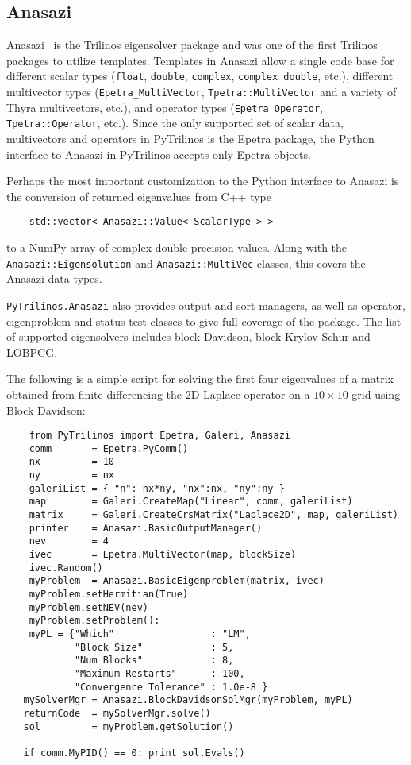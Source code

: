 \documentclass[11pt]{article}
\begin{document}
\subsection{Anasazi}
\label{sec:anasazi}

Anasazi~\cite{Anasazi} is the Trilinos eigensolver package and was one of the first Trilinos packages to utilize templates.  Templates in Anasazi allow a single code base for different scalar types ({\tt float}, {\tt double}, {\tt complex}, {\tt complex double}, etc.), different multivector types ({\tt Epetra\_MultiVector}, {\tt Tpetra::MultiVector} and a variety of Thyra multivectors, etc.), and operator types ({\tt Epetra\_Operator}, {\tt Tpetra::Operator}, etc.).  Since the only supported set of scalar data, multivectors and operators in PyTrilinos is the Epetra package, the Python interface to Anasazi in PyTrilinos accepts only Epetra objects.

Perhaps the most important customization to the Python interface to Anasazi is the conversion of returned eigenvalues from C++ type
\begin{verbatim}
    std::vector< Anasazi::Value< ScalarType > >
\end{verbatim}
to a NumPy array of complex double precision values.  Along with the {\tt Anasazi::Eigensolution} and {\tt Anasazi::MultiVec} classes, this covers the Anasazi data types.

{\tt PyTrilinos.Anasazi} also provides output and sort managers, as well as operator, eigenproblem and status test classes to give full coverage of the package.  The list of supported eigensolvers includes block Davidson, block Krylov-Schur and LOBPCG.

The following is a simple script for solving the first four eigenvalues of a matrix obtained from finite differencing the 2D Laplace operator on a $10\times10$ grid using Block Davidson:
\begin{verbatim}
    from PyTrilinos import Epetra, Galeri, Anasazi
    comm       = Epetra.PyComm()
    nx         = 10
    ny         = nx
    galeriList = { "n": nx*ny, "nx":nx, "ny":ny }
    map        = Galeri.CreateMap("Linear", comm, galeriList)
    matrix     = Galeri.CreateCrsMatrix("Laplace2D", map, galeriList)
    printer    = Anasazi.BasicOutputManager()
    nev        = 4
    ivec       = Epetra.MultiVector(map, blockSize)
    ivec.Random()
    myProblem  = Anasazi.BasicEigenproblem(matrix, ivec)
    myProblem.setHermitian(True)
    myProblem.setNEV(nev)
    myProblem.setProblem():
    myPL = {"Which"                 : "LM",
            "Block Size"            : 5,
            "Num Blocks"            : 8,
            "Maximum Restarts"      : 100,
            "Convergence Tolerance" : 1.0e-8 }
   mySolverMgr = Anasazi.BlockDavidsonSolMgr(myProblem, myPL)
   returnCode  = mySolverMgr.solve()
   sol         = myProblem.getSolution()

   if comm.MyPID() == 0: print sol.Evals()
\end{verbatim}
\end{document}
